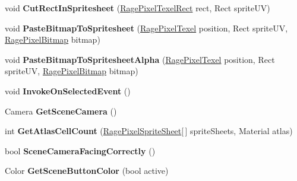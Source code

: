 \begin{DoxyCompactItemize}
\item 
\hypertarget{class_rage_pixel_sprite_editor_a12ca192ebb349ffaccc9d53f1805ef85}{void {\bfseries Cut\-Rect\-In\-Spritesheet} (\hyperlink{class_rage_pixel_texel_rect}{Rage\-Pixel\-Texel\-Rect} rect, Rect sprite\-U\-V)}\label{class_rage_pixel_sprite_editor_a12ca192ebb349ffaccc9d53f1805ef85}

\item 
\hypertarget{class_rage_pixel_sprite_editor_a2abd45da3cab0deeca35b1a35d536cde}{void {\bfseries Paste\-Bitmap\-To\-Spritesheet} (\hyperlink{class_rage_pixel_texel}{Rage\-Pixel\-Texel} position, Rect sprite\-U\-V, \hyperlink{class_rage_pixel_bitmap}{Rage\-Pixel\-Bitmap} bitmap)}\label{class_rage_pixel_sprite_editor_a2abd45da3cab0deeca35b1a35d536cde}

\item 
\hypertarget{class_rage_pixel_sprite_editor_af24a50a2a9395d577a2cf20581930e22}{void {\bfseries Paste\-Bitmap\-To\-Spritesheet\-Alpha} (\hyperlink{class_rage_pixel_texel}{Rage\-Pixel\-Texel} position, Rect sprite\-U\-V, \hyperlink{class_rage_pixel_bitmap}{Rage\-Pixel\-Bitmap} bitmap)}\label{class_rage_pixel_sprite_editor_af24a50a2a9395d577a2cf20581930e22}

\item 
\hypertarget{class_rage_pixel_sprite_editor_aa88987839d4c79686893913826ffc484}{void {\bfseries Invoke\-On\-Selected\-Event} ()}\label{class_rage_pixel_sprite_editor_aa88987839d4c79686893913826ffc484}

\item 
\hypertarget{class_rage_pixel_sprite_editor_add5dfd38c1894275f4f6a3b75d6e2f0b}{Camera {\bfseries Get\-Scene\-Camera} ()}\label{class_rage_pixel_sprite_editor_add5dfd38c1894275f4f6a3b75d6e2f0b}

\item 
\hypertarget{class_rage_pixel_sprite_editor_a45f096459edb8fd0118ce4a9750cf83f}{int {\bfseries Get\-Atlas\-Cell\-Count} (\hyperlink{class_rage_pixel_sprite_sheet}{Rage\-Pixel\-Sprite\-Sheet}\mbox{[}$\,$\mbox{]} sprite\-Sheets, Material atlas)}\label{class_rage_pixel_sprite_editor_a45f096459edb8fd0118ce4a9750cf83f}

\item 
\hypertarget{class_rage_pixel_sprite_editor_ac1fda321f7e80ea33ce3aa1f37cb1f0b}{bool {\bfseries Scene\-Camera\-Facing\-Correctly} ()}\label{class_rage_pixel_sprite_editor_ac1fda321f7e80ea33ce3aa1f37cb1f0b}

\item 
\hypertarget{class_rage_pixel_sprite_editor_a0d8e7bcb9d8066536c93dc6b347008b5}{Color {\bfseries Get\-Scene\-Button\-Color} (bool active)}\label{class_rage_pixel_sprite_editor_a0d8e7bcb9d8066536c93dc6b347008b5}

\end{DoxyCompactItemize}
